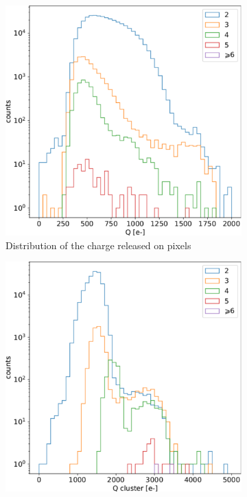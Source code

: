         \begin{figure}
            \centering
            \begin{subfigure}[b]{0.49\textwidth}
                \centering
                \includegraphics[width=\linewidth]{figures/charaterization/Fe55_spectrum_per_pixel.pdf}
                \caption{Distribution of the charge released on pixels}
                \label{fig:Fe55_pixel}
            \end{subfigure}
            \hfill
            \begin{subfigure}[b]{0.49\textwidth}
                \centering
                \includegraphics[width=\linewidth]{figures/charaterization/Fe55_spectrum_cluster.pdf}

\end{subfigure}
\end{figure}
